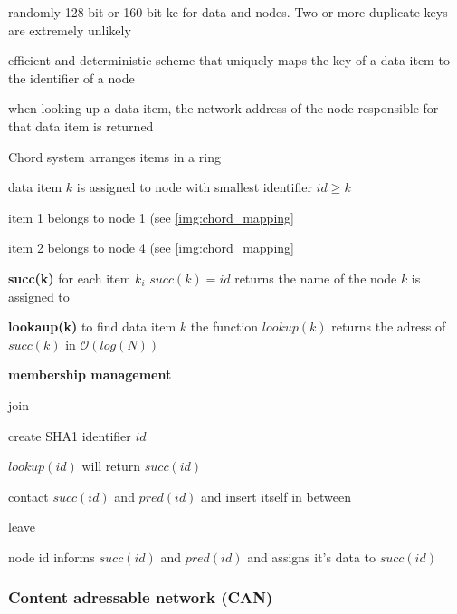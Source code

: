\documentclass[ngerman,a4paper]{report}
\begin{document}
\begin{compactitem}
	\item randomly 128 bit or 160 bit ke for data and nodes. Two or more duplicate keys are extremely unlikely
	\item efficient and deterministic scheme that uniquely maps the key of a data item to the identifier of a node
	\item when looking up a data item, the network address of the node responsible for that data item is returned
	\item Chord system arranges items in a ring
	\item data item $k$ is assigned to node with smallest identifier $id \geq k$
	\begin{compactitem}
		\item item 1 belongs to node 1 (see \ref{img:chord_mapping}
		\item item 2 belongs to node 4 (see \ref{img:chord_mapping}		
	\end{compactitem}		
	\item \textbf{succ(k)} for each item $k_i$ $succ(k)=id$ returns  the name of the node $k$ is assigned to
	\item \textbf{lookaup(k)} to find data item $k$ the function $lookup(k)$ returns the adress of $succ(k)$ in $\mathcal{O}(log(N))$
	\item \textbf{membership management}
	\begin{compactitem}
		\item join
		\begin{compactitem}
			\item create SHA1 identifier $id$
			\item $lookup(id)$  will return $succ(id)$
			\item contact $succ(id)$ and $pred(id)$ and insert itself in between
		\end{compactitem}
		\item leave
		\begin{compactitem}
			\item node id informs $succ(id)$ and $pred(id)$ and assigns it's data to $succ(id)$
		\end{compactitem}
	\end{compactitem}
\end{compactitem}


\subsubsection{Content adressable network (CAN)}
\end{document}
